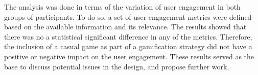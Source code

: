 The analysis was done in terms of the variation of user engagement in both groups of participants. To do so, a set of user engagement metrics were defined based on the available information and its relevance. The results showed that there was no a statistical significant difference in any of the metrics. Therefore, the inclusion of a casual game as part of a gamification strategy did not have a positive or negative impact on the user engagement. These results served as the base to discuss potential issues in the design, and propose further work.